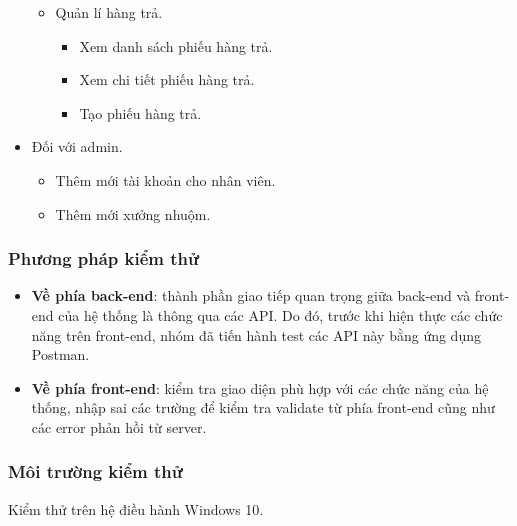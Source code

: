 \begin{itemize}
\begin{itemize}
        \item Quản lí hàng trả.
        \begin{itemize}
            \item Xem danh sách phiếu hàng trả.
            \item Xem chi tiết phiếu hàng trả.
            \item Tạo phiếu hàng trả.
        \end{itemize}
    \end{itemize}
    \item Đối với admin.
    \begin{itemize}
        \item Thêm mới tài khoản cho nhân viên.
        \item Thêm mới xưởng nhuộm.
    \end{itemize}
\end{itemize}

\subsubsection{Phương pháp kiểm thử}
\begin{itemize}
    \item \textbf{Về phía back-end}: thành phần giao tiếp quan trọng giữa back-end và front-end của hệ thống là thông qua các API. Do đó, trước khi hiện thực các chức năng trên front-end, nhóm đã tiến hành test các API này bằng ứng dụng Postman.
    \item \textbf{Về phía front-end}: kiểm tra giao diện phù hợp với các chức năng của hệ thống, nhập sai các trường để kiểm tra validate từ phía front-end cũng như các error phản hồi từ server.
\end{itemize}

\subsubsection{Môi trường kiểm thử}
Kiểm thử trên hệ điều hành Windows 10.
\newpage